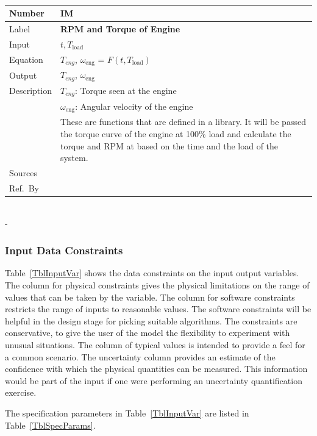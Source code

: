 \documentclass[12pt]{article}
\newcommand{\colAwidth}{0.13\textwidth}
\newcommand{\colBwidth}{0.82\textwidth}
\newcounter{instnum} %
\newcommand{\definstance}[7] {
~\newline
\noindent
\begin{minipage}{\textwidth}
\renewcommand*{\arraystretch}{1.5}
\begin{tabular}{| p{\colAwidth} | p{\colBwidth}|}
  \hline
  \rowcolor[gray]{0.9}
  Number& IM\refstepcounter{instnum}\theinstnum \label{inst:\theinstnum}\\
  \hline
  Label& \bf #1 \\
  \hline
  Input& #2\\
  \hline
  Equation& #3\\
  \hline
  Output& #4\\
  \hline
  Description& #5 \\
  \hline
  Sources& #6 \\
  \hline
  Ref.\ By & #7\\
  \hline
\end{tabular}
\end{minipage}\\
}
\begin{document}
\definstance
{RPM and Torque of Engine}
{$t, T_\text{load}$} %
{{$T_{eng}$,  $\omega_\text{eng}$ } = $F(t, T_\text{load})$} %
{$T_{eng}$, $\omega_\text{eng}$} %
{
  $T_{eng}$: Torque seen at the engine\\
& $\omega_\text{eng}$: Angular velocity of the engine\\
& These are functions that are defined in a library. It will be passed the torque curve of the engine at 100\% load and calculate the torque and RPM at based on the time and the load of the system.
} %
{} %
{} %
{-}

\subsubsection{Input Data Constraints} \label{sec_DataConstraints}    

Table~\ref{TblInputVar} shows the data constraints on the input output
variables.  The column for physical constraints gives the physical limitations
on the range of values that can be taken by the variable.  The column for
software constraints restricts the range of inputs to reasonable values.  The
software constraints will be helpful in the design stage for picking suitable
algorithms.  The constraints are conservative, to give the user of the model the
flexibility to experiment with unusual situations.  The column of typical values
is intended to provide a feel for a common scenario.  The uncertainty column
provides an estimate of the confidence with which the physical quantities can be
measured.  This information would be part of the input if one were performing an
uncertainty quantification exercise.

The specification parameters in Table~\ref{TblInputVar} are listed in
Table~\ref{TblSpecParams}.
\end{document}
